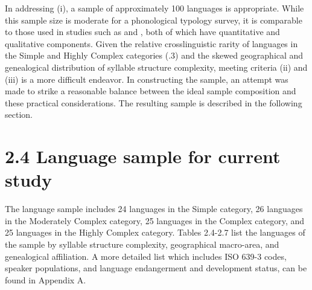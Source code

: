  In addressing (i), a sample of approximately 100 languages is appropriate. While this sample size is moderate for a phonological typology survey, it is comparable to those used in studies such as \citet{Bateman2007} and \citet{BybeeEasterday2019}, both of which have quantitative and qualitative components. Given the relative crosslinguistic rarity of languages in the Simple and Highly Complex categories (.3) and the skewed geographical and genealogical distribution of syllable structure complexity, meeting criteria (ii) and (iii) is a more difficult endeavor. In constructing the sample, an attempt was made to strike a reasonable balance between the ideal sample composition and these practical considerations. The resulting sample is described in the following section.

\section{\rmfamily} 
\section{2.4 Language sample for current study}

  The language sample includes 24 languages in the Simple category, 26 languages in the Moderately Complex category, 25 languages in the Complex category, and 25 languages in the Highly Complex category. Tables 2.4-2.7 list the languages of the sample by syllable structure complexity, geographical macro-area, and genealogical affiliation. A more detailed list which includes ISO 639-3 codes, speaker populations, and language endangerment and development status, can be found in Appendix A.


